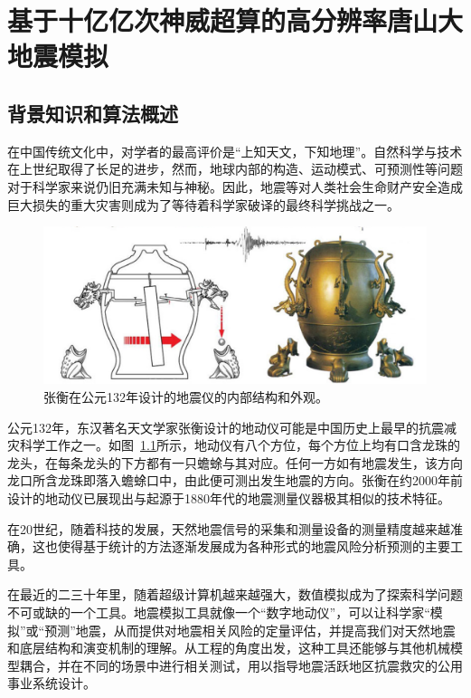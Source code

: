 \documentclass[degree=doctor]{thuthesis}
\begin{document}
\frontmatter

\tableofcontents




\mainmatter
\chapter{基于十亿亿次神威超算的高分辨率唐山大地震模拟}
\label{chap:earthquake}

\section{背景知识和算法概述}

在中国传统文化中，对学者的最高评价是“上知天文，下知地理”。自然科学与技术在上世纪取得了长足的进步，然而，地球内部的构造、运动模式、可预测性等问题对于科学家来说仍旧充满未知与神秘。因此，地震等对人类社会生命财产安全造成巨大损失的重大灾害则成为了等待着科学家破译的最终科学挑战之一\citep{anderson1989theory}。

\begin{figure}[t]
\centering
\includegraphics[width=0.7\columnwidth]{seismoscope.png}
\caption{张衡在公元132年设计的地震仪的内部结构和外观\citep{hsiao2009review}。}
\label{fig:heng-scope}
\end{figure}

公元132年，东汉著名天文学家张衡设计的地动仪可能是中国历史上最早的抗震减灾科学工作之一\citep{stein2009introduction}。如图~\ref{fig:heng-scope}所示，地动仪有八个方位，每个方位上均有口含龙珠的龙头，在每条龙头的下方都有一只蟾蜍与其对应。任何一方如有地震发生，该方向龙口所含龙珠即落入蟾蜍口中，由此便可测出发生地震的方向\cite{seismoscopewiki}。张衡在约2000年前设计的地动仪已展现出与起源于1880年代的地震测量仪器极其相似的技术特征。

在20世纪，随着科技的发展，天然地震信号的采集和测量设备的测量精度越来越准确，这也使得基于统计的方法逐渐发展成为各种形式的地震风险分析预测的主要工具。

在最近的二三十年里，随着超级计算机越来越强大，数值模拟成为了探索科学问题不可或缺的一个工具。地震模拟工具就像一个“数字地动仪”，可以让科学家“模拟”或“预测”地震，从而提供对地震相关风险的定量评估，并提高我们对天然地震和底层结构和演变机制的理解。从工程的角度出发，这种工具还能够与其他机械模型耦合，并在不同的场景中进行相关测试，用以指导地震活跃地区抗震救灾的公用事业系统设计。
\end{document}
